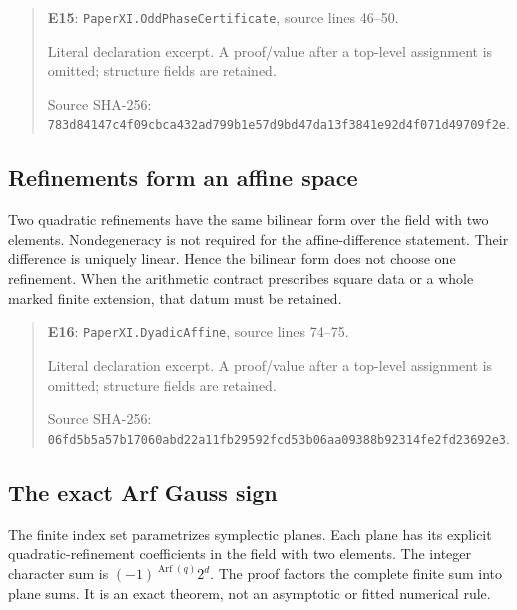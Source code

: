 \documentclass[10pt,oneside]{book}
\begin{document}
\begin{quote}\footnotesize\textbf{E15}: \nolinkurl{PaperXI.OddPhaseCertificate}, source lines 46--50.\par Literal declaration excerpt. A proof/value after a top-level assignment is omitted; structure fields are retained.\par Source SHA-256: {\scriptsize\texttt{783d84147c4f09cbca432ad799b1e57d9bd47da13f3841e92d4f071d49709f2e}}.\end{quote}


\subsection{Refinements form an affine space}
\label{guide:E16}
Two quadratic refinements have the same bilinear form over the field with two elements. Nondegeneracy is not required for the affine-difference statement.
Their difference is uniquely linear. Hence the bilinear form does not choose one refinement. When the arithmetic contract prescribes square data or a whole marked finite extension, that datum must be retained.

\begin{quote}\footnotesize\textbf{E16}: \nolinkurl{PaperXI.DyadicAffine}, source lines 74--75.\par Literal declaration excerpt. A proof/value after a top-level assignment is omitted; structure fields are retained.\par Source SHA-256: {\scriptsize\texttt{06fd5b5a57b17060abd22a11fb29592fcd53b06aa09388b92314fe2fd23692e3}}.\end{quote}


\subsection{The exact Arf Gauss sign}
\label{guide:E17}
The finite index set parametrizes symplectic planes. Each plane has its explicit quadratic-refinement coefficients in the field with two elements.
The integer character sum is \( (-1)^{\operatorname{Arf}(q)}2^d\). The proof factors the complete finite sum into plane sums. It is an exact theorem, not an asymptotic or fitted numerical rule.
\end{document}
